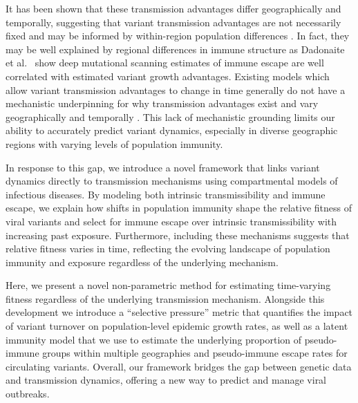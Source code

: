 \documentclass[12pt,oneside,letterpaper]{article}
\begin{document}
It has been shown that these transmission advantages differ geographically and temporally, suggesting that variant transmission advantages are not necessarily fixed and may be informed by within-region population differences \cite{figgins2022sars, vanDorp2022}.
In fact, they may be well explained by regional differences in immune structure as Dadonaite et al.\ \cite{Dadonaite2023} show deep mutational scanning estimates of immune escape are well correlated with estimated variant growth advantages.
Existing models which allow variant transmission advantages to change in time generally do not have a mechanistic underpinning for why transmission advantages exist and vary geographically and temporally \cite{figgins2022sars, susswein2023leveraging}.
This lack of mechanistic grounding limits our ability to accurately predict variant dynamics, especially in diverse geographic regions with varying levels of population immunity.

In response to this gap, we introduce a novel framework that links variant dynamics directly to transmission mechanisms using compartmental models of infectious diseases.
By modeling both intrinsic transmissibility and immune escape, we explain how shifts in population immunity shape the relative fitness of viral variants and select for immune escape over intrinsic transmissibility with increasing past exposure.
Furthermore, including these mechanisms suggests that relative fitness varies in time, reflecting the evolving landscape of population immunity and exposure regardless of the underlying mechanism.

Here, we present a novel non-parametric method for estimating time-varying fitness regardless of the underlying transmission mechanism.
Alongside this development we introduce a ``selective pressure'' metric that quantifies the impact of variant turnover on population-level epidemic growth rates, as well as a latent immunity model that we use to estimate the underlying proportion of pseudo-immune groups within multiple geographies and pseudo-immune escape rates for circulating variants.
Overall, our framework bridges the gap between genetic data and transmission dynamics, offering a new way to predict and manage viral outbreaks.
\end{document}
